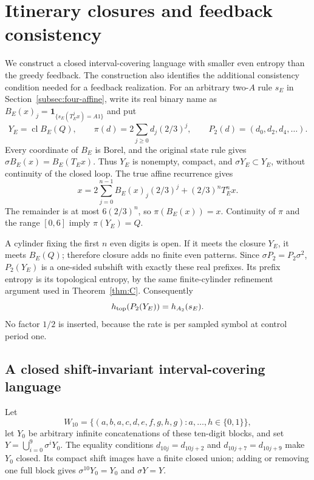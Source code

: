 \documentclass[11pt,reqno]{amsart}
\numberwithin{equation}{section}
\theoremstyle{definition}
\newcommand{\one}{\mathbf 1}
\newcommand{\cl}{\operatorname{cl}}
\begin{document}
\section{Itinerary closures and feedback consistency}
\label{app:language}

We construct a closed interval-covering language with smaller even
entropy than the greedy feedback. The construction also identifies the
additional consistency condition needed for a feedback realization.
For an arbitrary two-$A$ rule $s_E$ in
Section~\ref{subsec:four-affine}, write its real binary name as
$B_E(x)_j=\one_{\{s_E(T_E^jx)=A1\}}$ and put
\[
 Y_E=\cl B_E(Q),\qquad
 \pi(d)=2\sum_{j\ge0}d_j(2/3)^j,
 \qquad P_2(d)=(d_0,d_2,d_4,\ldots).
\]
Every coordinate of $B_E$ is Borel, and the original state rule
gives $\sigma B_E(x)=B_E(T_Ex)$. Thus $Y_E$ is nonempty,
compact, and $\sigma Y_E\subset Y_E$, without continuity of
the closed loop. The true affine recurrence gives
\[
 x=2\sum_{j=0}^{n-1}B_E(x)_j(2/3)^j+(2/3)^nT_E^nx.
\]
The remainder is at most $6(2/3)^n$, so $\pi(B_E(x))=x$.
Continuity of $\pi$ and the range $[0,6]$ imply
$\pi(Y_E)=Q$.

A cylinder fixing the first $n$ even digits is open. If it meets
the closure $Y_E$, it meets $B_E(Q)$; therefore closure adds
no finite even patterns. Since $\sigma P_2=P_2\sigma^2$,
$P_2(Y_E)$ is a one-sided subshift with exactly these real
prefixes. Its prefix entropy is its topological entropy, by the
same finite-cylinder refinement argument used in
Theorem~\ref{thm:C}. Consequently
\begin{equation}\label{eq:closure-even}
 h_{\rm top}(P_2(Y_E))=h_{A_2}(s_E).
\end{equation}
No factor $1/2$ is inserted, because the rate is per sampled
symbol at control period one.

\subsection{A closed shift-invariant interval-covering language}
Let
\[
 W_{10}=\{(a,b,a,c,d,e,f,g,h,g):a,\ldots,h\in\{0,1\}\},
\]
let $Y_0$ be arbitrary infinite concatenations of these ten-digit
blocks, and set $Y=\bigcup_{i=0}^9\sigma^iY_0$.
The equality conditions $d_{10j}=d_{10j+2}$ and
$d_{10j+7}=d_{10j+9}$ make $Y_0$ closed.
Its compact shift images have a finite closed union; adding or
removing one full block gives $\sigma^{10}Y_0=Y_0$ and
$\sigma Y=Y$.
\end{document}
